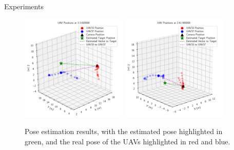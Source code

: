 \documentclass{beamer}
\begin{document}
\begin{frame}{Experiments}

\begin{figure}[H]
	\centering
	  \includegraphics[width=0.45\textwidth]{../fig/pgfplot/build/3dplot3.pdf}
	  \includegraphics[width=0.45\textwidth]{../fig/pgfplot/build/3dplot1.pdf}
	\caption{
           Pose estimation results, with the estimated pose highlighted in green, and the real pose of the UAVs highlighted in red and blue.
        }
	\label{fig:poseresults}
\end{figure}

\end{frame}

\end{document}
